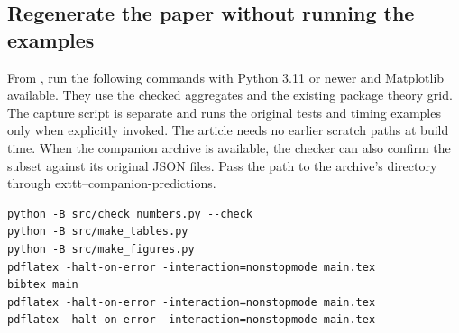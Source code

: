\subsection{Regenerate the paper without running the examples}

From , run the following commands with Python 3.11 or newer and Matplotlib available. They use the checked aggregates and the existing package theory grid. The capture script is separate and runs the original tests and timing examples only when explicitly invoked. The article needs no earlier scratch paths at build time. When the companion archive is available, the checker can also confirm the subset against its original JSON files. Pass the path to the archive's  directory through 	exttt{--companion-predictions}.

\begin{lstlisting}[language={}]
python -B src/check_numbers.py --check
python -B src/make_tables.py
python -B src/make_figures.py
pdflatex -halt-on-error -interaction=nonstopmode main.tex
bibtex main
pdflatex -halt-on-error -interaction=nonstopmode main.tex
pdflatex -halt-on-error -interaction=nonstopmode main.tex
\end{lstlisting}
